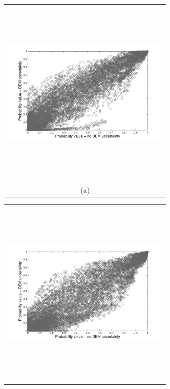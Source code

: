 \documentclass[12pt]{article}
\newcommand{\Pic}[2][0.85]{\begin{center}\texttt{[image: \#2]}
 \end{center} }
\begin{document}

\begin{figure}[H]
      \begin{minipage}[b]{0.6\textwidth}
        \begin{tabular}{c}
       \includegraphics[width=8cm,height=9cm,keepaspectratio]{figs_pdf/Galeras_Aster_vs_meth0.pdf}\\
        (a)
        \end{tabular}
    \end{minipage}
    \begin{minipage}{0.6\textwidth}
        \begin{tabular}{c}
	\includegraphics[width=8cm,height=9cm,keepaspectratio]{figs_pdf/Galeras_Aster_vs_meth3.pdf}\\

\end{tabular}
\end{minipage}
\end{figure}
\end{document}
